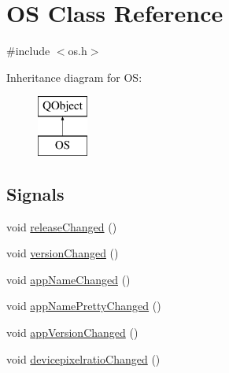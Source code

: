 \hypertarget{classOS}{}\section{OS Class Reference}
\label{classOS}


{\ttfamily \#include $<$os.\+h$>$}

Inheritance diagram for OS\+:\begin{figure}[H]
\begin{center}
\leavevmode
\includegraphics[height=2.000000cm]{classOS}
\end{center}
\end{figure}
\subsection*{Signals}
\begin{DoxyCompactItemize}
\item 
void \mbox{\hyperlink{classOS_a58369b88b24b1701b020bd0971d99c03}{release\+Changed}} ()
\item 
void \mbox{\hyperlink{classOS_a2bb282eb19c9eaa0c787dabc434a9fca}{version\+Changed}} ()
\item 
void \mbox{\hyperlink{classOS_ad55c57724a077d427b89ede6e1f8b235}{app\+Name\+Changed}} ()
\item 
void \mbox{\hyperlink{classOS_a21d29e6b9eef2bccc62db0d29d56b4c5}{app\+Name\+Pretty\+Changed}} ()
\item 
void \mbox{\hyperlink{classOS_a39f7a3688e008fde1008e6b7e5b5ebcb}{app\+Version\+Changed}} ()
\item 
void \mbox{\hyperlink{classOS_a0ecbe56e6ec612ba6f78af5086505751}{devicepixelratio\+Changed}} ()
\end{DoxyCompactItemize}
